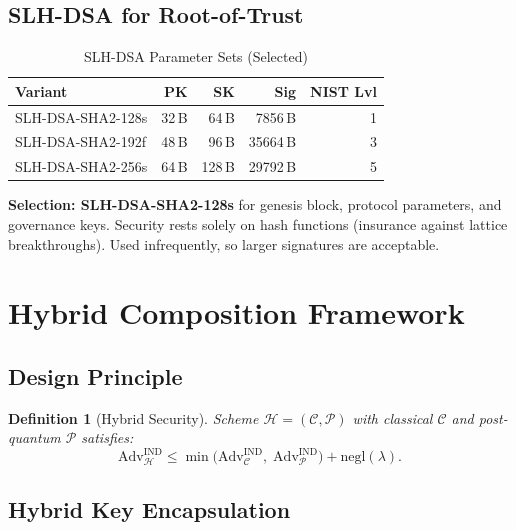 \documentclass[11pt,a4paper]{article}
\newtheorem{definition}{Definition}[section]
\begin{document}
\subsection{SLH-DSA for Root-of-Trust}

\begin{table}[h]
\centering
\caption{SLH-DSA Parameter Sets (Selected)}
\label{tab:slhdsa}
\begin{tabular}{@{}lrrrr@{}}
\toprule
\textbf{Variant} & \textbf{PK} & \textbf{SK} & \textbf{Sig} &
    \textbf{NIST Lvl} \\
\midrule
SLH-DSA-SHA2-128s & 32\,B  & 64\,B  &  7856\,B & 1 \\
SLH-DSA-SHA2-192f & 48\,B  & 96\,B  & 35664\,B & 3 \\
SLH-DSA-SHA2-256s & 64\,B  & 128\,B & 29792\,B & 5 \\
\bottomrule
\end{tabular}
\end{table}

\textbf{Selection: SLH-DSA-SHA2-128s} for genesis block, protocol
parameters, and governance keys.  Security rests solely on hash functions
(insurance against lattice breakthroughs).  Used infrequently, so larger
signatures are acceptable.

\section{Hybrid Composition Framework}
\label{sec:hybrid}

\subsection{Design Principle}

\begin{definition}[Hybrid Security]
    Scheme $\mathcal{H} = (\mathcal{C}, \mathcal{P})$ with classical
    $\mathcal{C}$ and post-quantum $\mathcal{P}$ satisfies:
    \[
        \mathrm{Adv}_{\mathcal{H}}^{\mathrm{IND}} \leq
        \min\bigl(\mathrm{Adv}_{\mathcal{C}}^{\mathrm{IND}},\;
        \mathrm{Adv}_{\mathcal{P}}^{\mathrm{IND}}\bigr)
        + \mathrm{negl}(\lambda).
    \]
\end{definition}

\subsection{Hybrid Key Encapsulation}
\end{document}
